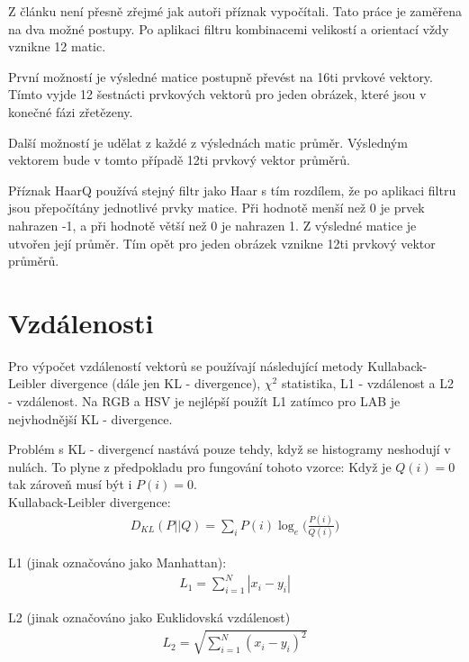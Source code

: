 \documentclass[czech,BP]{thesiskiv}
\begin{document}
\par Z článku \cite{JEC} není přesně zřejmé jak autoři příznak vypočítali. Tato práce je zaměřena na dva možné postupy. Po aplikaci filtru kombinacemi velikostí a orientací vždy vznikne 12 matic. 
\par První možností je výsledné matice postupně převést na 16ti prvkové vektory. Tímto vyjde 12 šestnácti prvkových vektorů pro jeden obrázek, které jsou v konečné fázi zřetězeny. 
\par Další možností je udělat z každé z výslednách matic průměr. Výsledným vektorem bude v tomto případě 12ti prvkový vektor průměrů. 

\par Příznak HaarQ používá stejný filtr jako Haar s tím rozdílem, že po aplikaci filtru jsou přepočítány jednotlivé prvky matice. Při hodnotě menší než 0 je prvek nahrazen -1, a při hodnotě větší než 0 je nahrazen 1. Z výsledné matice je utvořen její průměr. Tím opět pro jeden obrázek vznikne 12ti prvkový vektor průměrů.   

\section{Vzdálenosti}
\par Pro výpočet vzdáleností vektorů se používají následující metody Kullaback-Leibler divergence (dále jen KL - divergence), $\chi^2$ statistika, L1 - vzdálenost a L2 - vzdálenost. Na RGB a HSV je nejlépší použít L1 zatímco pro LAB je nejvhodnější KL - divergence. 

Problém s KL - divergencí nastává pouze tehdy, když se histogramy neshodují v nulách. To plyne z předpokladu pro fungování tohoto vzorce: Když je $Q(i) = 0$ tak zároveň musí být i $P(i) = 0$. \\

Kullaback-Leibler divergence:
\begin{align}
   \label{kl}  D_{KL} (P || Q) = \sum_{i} P(i) \log_e \bigg({\frac{P(i)}{Q(i)}} \bigg) 
\end{align}

L1 (jinak označováno jako Manhattan):
\begin{align}
   \label{L1} L_1 = \sum_{i=1}^{N} |x_i - y_i|  
\end{align}

L2 (jinak označováno jako Euklidovská vzdálenost)
\begin{align}
   \label{L2} L_2 = \sqrt{\sum_{i=1}^{N} (x_i - y_i)^2}  
\end{align}
 
\end{document}
